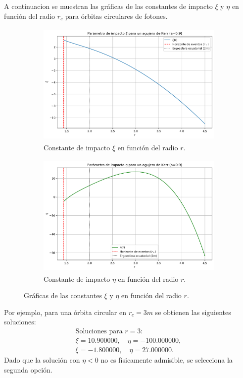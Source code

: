 A continuacion se muestran las gráficas de las constantes de impacto $\xi$ y $\eta$ en función del radio $r_c$ para órbitas circulares de fotones.
\begin{figure}[H]
    \begin{subfigure}{0.5\textwidth}
        \includegraphics[width=0.9\linewidth, height=6cm]{AgujerosNegros/kerr/geodesics_plots/circular_xi_vs_r_kerr.png}
        \caption{Constante de impacto $\xi$ en función del radio $r$.}
    \end{subfigure}
    \begin{subfigure}{0.5\textwidth}
        \includegraphics[width=0.9\linewidth, height=6cm]{AgujerosNegros/kerr/geodesics_plots/circular_eta_vs_r_kerr.png}
        \caption{Constante de impacto $\eta$ en función del radio $r$.}
    \end{subfigure}
    \caption{Gráficas de las constantes $\xi$ y $\eta$ en función del radio $r$.}
\end{figure}
Por ejemplo, para una órbita circular en $r_c = 3m$ se obtienen las siguientes soluciones:
\begin{equation}
    \begin{array}{l}
        \text{Soluciones para } r=3:              \\
        \xi = 10.900000,\quad \eta = -100.000000, \\
        \xi = -1.800000,\quad \eta = 27.000000.
    \end{array}
\end{equation}
Dado que la solución con $\eta < 0$ no es físicamente admisible, se selecciona la segunda opción.

